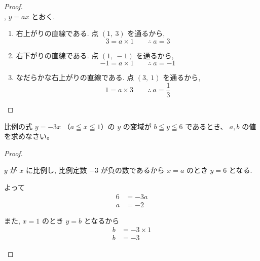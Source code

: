 \begin{proof}\mbox{}\\
    , $y = ax$ とおく.

    \begin{hiddenanswer}
        \begin{enumerate}
            \item 右上がりの直線である. 点 $(1,\ 3)$ を通るから,
            \[3 = a \times 1 \qquad \therefore\ a = 3\]

            \item 右下がりの直線である. 点 $(1,\ -1)$ を通るから,
            \[-1 = a \times 1 \qquad \therefore\ a = -1\]

            \item なだらかな右上がりの直線である. 点 $(3,\ 1)$ を通るから,
            \[1 = a \times 3 \qquad \therefore\ a = \dfrac{1}{3}\]
        \end{enumerate}
    \end{hiddenanswer}
\end{proof}
\newpage

\begin{exercise}
    比例の式 $y = -3x$ （$a \leqq x \leqq 1$）の $y$ の変域が $b \leqq y \leqq 6$ であるとき、 $a, b$ の値を求めなさい。
\end{exercise}

\begin{proof}\mbox{}\\
    \begin{hiddenanswer}
        $y$ が $x$ に比例し, 比例定数 $-3$ が負の数であるから $x = a$ のとき $y = 6$ となる.

        よって
        \begin{align*}
            6 &= -3a \\
            a &= -2
        \end{align*}

        また, $x = 1$ のとき $y = b$ となるから
        \begin{align*}
            b &= -3 \times 1 \\
            b &= -3
        \end{align*}
    \end{hiddenanswer}
\end{proof}

